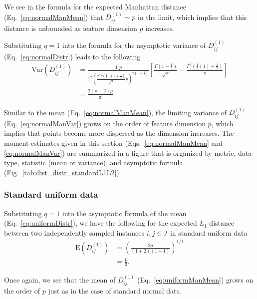 \documentclass[10pt,letterpaper]{article}
\begin{document}
We see in the formula for the expected Manhattan distance (Eq.~\ref{eq:normalManMean}) that $D^{(1)}_{ij} \sim p$ in the limit, which implies that this distance is unbounded as feature dimension $p$ increases.

Substituting $q=1$ into the formula for the asymptotic variance of $D^{(1)}_{ij}$ (Eq.~\ref{eq:normalDistr}) leads to the following
%
\begin{equation}\label{eq:normalManVar}
\begin{aligned}
\text{Var}\left(D^{(1)}_{ij}\right) &= \frac{4^1p}{1^2\left(\frac{2^1\Gamma\left(\frac{1}{2}(1) + \frac{1}{2}\right)}{\sqrt{\pi}}p\right)^{2\left(1 - \frac{1}{1}\right)}}\left[\frac{\Gamma\left(1 + \frac{1}{2}\right)}{\sqrt{\pi}} - \frac{\Gamma^2\left(\frac{1}{2}(1) + \frac{1}{2}\right)}{\pi}\right] \\
&= \frac{2(\pi - 2)p}{\pi}.
\end{aligned}
\end{equation}

Similar to the mean (Eq.~\ref{eq:normalManMean}), the limiting variance of $D^{(1)}_{ij}$ (Eq.~\ref{eq:normalManVar}) grows on the order of feature dimension $p$, which implies that points become more dispersed as the dimension increases. The moment estimates given in this section (Eqs.~\ref{eq:normalManMean} and \ref{eq:normalManVar}) are summarized in a figure that is organized by metric, data type, statistic (mean or variance), and asymptotic formula (Fig.~\ref{tab:dist_distr_standardL1L2}).

\subsubsection{Standard uniform data}

Substituting $q=1$ into the asymptotic formula of the mean (Eq.~\ref{eq:uniformDistr}), we have the following for the expected $L_1$ distance between two independently sampled instances $i,j \in \mathcal{I}$ in standard uniform data
%
\begin{equation}\label{eq:uniformManMean}
\begin{aligned}
\text{E}\left(D^{(1)}_{ij}\right) &= \left(\frac{2p}{(1+2)(1+1)}\right)^{1/1} \\
&= \frac{p}{3}.
\end{aligned}
\end{equation}

Once again, we see that the mean of $D^{(1)}_{ij}$ (Eq.~\ref{eq:uniformManMean}) grows on the order of $p$ just as in the case of standard normal data.
\end{document}
